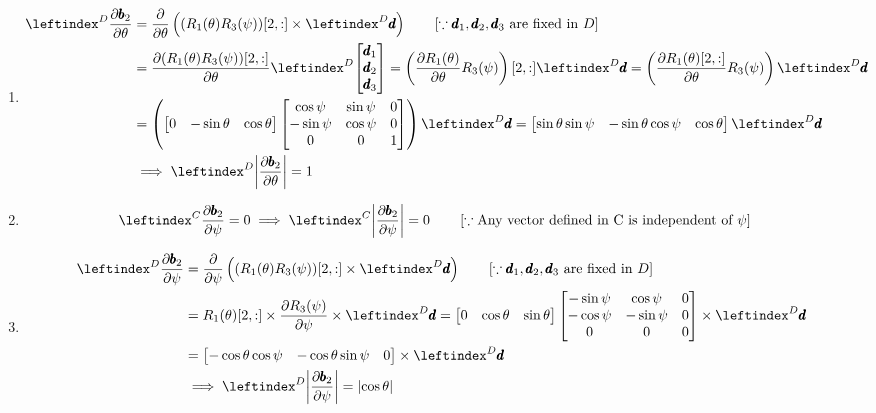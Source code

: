 \begin{enumerate}
 \item
 \begin{align*}
    \lx{^D}{\frac {\partial \pmb b_2}  {\partial \theta}} &= \frac {\partial}  {\partial \theta} \left((R_1(\theta) R_3(\psi))[2,:] \times \lx{^D}{\pmb d} \right)
    \qquad \left[\because \pmb d_1, \pmb d_2, \pmb d_3 \text{ are fixed in } D \right]\\
    &= \frac{\partial (R_1(\theta) R_3(\psi))[2,:]}{\partial \theta} \lx{^D}{\bm{\pmb d_1 \\ \pmb d_2 \\ \pmb d_3}}
    = \left(\frac{\partial R_1(\theta) }{\partial \theta} R_3(\psi) \right) [2,:]\lx{^D}{\pmb d}
    = \left(\frac{\partial R_1(\theta)[2,:] }{\partial \theta} R_3(\psi) \right)\lx{^D}{\pmb d}\\
    &=  \left( \bm{0 & -\sin \theta & \cos \theta}
    \bm{
            \cos \psi & \sin \psi  & 0\\
            -\sin \psi & \cos \psi & 0\\
            0          & 0         & 1
        } \right)\lx{^D}{\pmb d}
    = \bm{\sin \theta \sin \psi & -\sin \theta \cos \psi & \cos \theta} \lx{^D}{\pmb d}\\
    &\implies  \lx{^D}{\norm{\frac {\partial \pmb b_2}  {\partial \theta}}} = 1
 \end{align*}

 \item
\begin{align*}
    \lx{^C}{\frac {\partial \pmb b_2}  {\partial \psi}} &= 0
    \implies \lx{^C}{\norm{\frac {\partial \pmb b_2}  {\partial \psi}}} = 0
    \qquad \left[ \because \text{Any vector defined in C is independent of } \psi \right]
\end{align*}

 \item
\begin{align*}
    \lx{^D}{\frac {\partial \pmb b_2}  {\partial \psi}} &= \frac{\partial}{\partial \psi} \left((R_1(\theta) R_3(\psi))[2,:] \times \lx{^D}{\pmb d} \right)
    \qquad \left[\because \pmb d_1, \pmb d_2, \pmb d_3 \text{ are fixed in } D \right]\\
    &= R_1(\theta)[2,:] \times \frac{\partial R_3(\psi)}{\partial \psi} \times \lx{^D}{\pmb d}
    = \bm{0 & \cos \theta & \sin \theta} \bm{-\sin \psi & \cos \psi & 0 \\
                                             -\cos \psi & -\sin \psi & 0\\
                                             0 & 0 & 0}
                        \times \lx{^D}{\pmb d}\\
    &= \bm{-\cos \theta \cos \psi & -\cos \theta \sin \psi & 0} \times \lx{^D}{\pmb d}\\
    &\implies  \lx{^D}{\norm{\frac {\partial \pmb b_2}  {\partial \psi}}} = \norm{\cos \theta}
\end{align*}


\end{enumerate}
